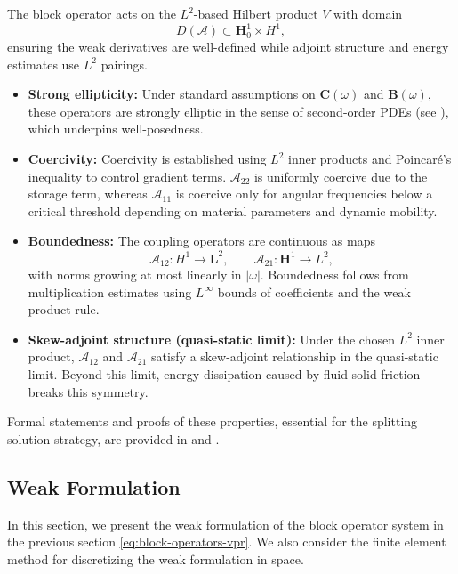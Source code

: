 \documentclass[pdflatex,sn-mathphys-num]{sn-jnl}
\theoremstyle{thmstyleone}%
\theoremstyle{thmstyletwo}%
\theoremstyle{thmstylethree}%
\theoremstyle{definition}
\begin{document}
	The block operator acts on the $L^2$-based Hilbert product $V$ with domain
	\[
	D(\mathcal{A}) \subset \bm{H}_0^{1} \times H^1,
	\]
	ensuring the weak \color{black} derivatives are well-defined while adjoint structure and energy estimates use $L^2$ pairings.
	
	\medskip
	\begin{itemize}
		\item \textbf{Strong ellipticity:} Under standard assumptions on $\mathbf{C}(\omega)$ and $\mathbf{B}(\omega)$, these operators are strongly elliptic in the sense of second-order PDEs (see \cite{Bonnet2016}), which underpins well-posedness.
		\item \textbf{Coercivity:} Coercivity is established using $L^2$ inner products and Poincar\'e’s inequality to control gradient terms. $\mathcal{A}_{22}$ is uniformly coercive due to the storage term, whereas $\mathcal{A}_{11}$ is coercive only for angular frequencies below a critical threshold depending on material parameters and dynamic mobility.
		\item \textbf{Boundedness:} The coupling operators are continuous as maps
		\[
		\mathcal{A}_{12}: H^1\to \bm{L}^{2},\qquad
		\mathcal{A}_{21}: \bm{H}^{1}\to L^2,
		\]
		with norms growing at most linearly in $|\omega|$. Boundedness follows from multiplication estimates using $L^\infty$ bounds of coefficients and the weak product rule.
		\item \textbf{Skew-adjoint structure (quasi-static limit):} Under the chosen $L^2$ inner product, $\mathcal{A}_{12}$ and $\mathcal{A}_{21}$ satisfy a skew-adjoint relationship in the quasi-static limit. Beyond this limit, energy dissipation caused by fluid-solid friction breaks this symmetry.
	\end{itemize}
	Formal statements and proofs of these properties, essential for the splitting solution strategy, are provided in  and .
	
	
	
	
	\subsection{Weak Formulation}
	In this section, we present the weak formulation of the block operator system in the previous section \eqref{eq:block-operators-vpr}. We also consider the finite element method for discretizing the weak formulation in space. 
	
\end{document}
